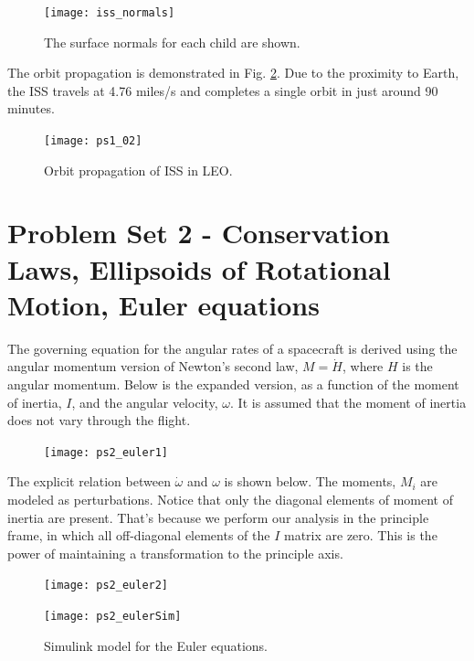 \documentclass[12pt, letterpaper]{article}
\begin{document}
\begin{figure}[H]
	\centering
	\texttt{[image: iss\_normals]}
	\caption{The surface normals for each child are shown.}
	\label{1:iss_normal}
\end{figure}



The orbit propagation is demonstrated in Fig. \ref{1:orbit2}. Due to the proximity to Earth, the ISS travels at 4.76 miles/s and completes a single orbit in just around 90 minutes.


\begin{figure}[H]
	\centering
	\texttt{[image: ps1\_02]}
	\caption{Orbit propagation of ISS in LEO.}
	\label{1:orbit2}
\end{figure}





\section{Problem Set 2 - Conservation Laws, Ellipsoids of Rotational Motion, Euler equations}

The governing equation for the angular rates of a spacecraft is derived using the angular momentum version of Newton's second law, $M = \dot{H}$, where $H$ is the angular momentum. Below is the expanded version, as a function of the moment of inertia, $I$, and the angular velocity, $\omega$. It is assumed that the moment of inertia does not vary through the flight.

\begin{figure}[H]
	\centering
	\texttt{[image: ps2\_euler1]}
\end{figure}

The explicit relation between $\dot{\omega}$ and $\omega$ is shown below. The moments, $M_i$ are modeled as perturbations. Notice that only the diagonal elements of moment of inertia are present. That's because we perform our analysis in the principle frame, in which all off-diagonal elements of the $I$ matrix are zero. This is the power of maintaining a transformation to the principle axis.

\begin{figure}[H]
	\centering
	\texttt{[image: ps2\_euler2]}
\end{figure}

\begin{figure}[H]
	\centering
	\texttt{[image: ps2\_eulerSim]}
	\caption{Simulink model for the Euler equations.}
	\label{2:eulerSim}
\end{figure}
\end{document}
